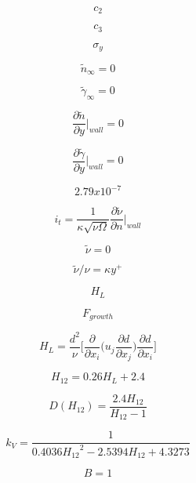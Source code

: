 \begin{equation}
c_2
\end{equation}

\begin{equation}
c_3
\end{equation}

\begin{equation}
\sigma_y
\end{equation}

\begin{equation}
\tilde{n}_{\infty} = 0
\end{equation}

\begin{equation}
\tilde{\gamma}_{\infty} = 0
\end{equation}

\begin{equation}
\frac{\partial \tilde{n}}{\partial y} \bigg|  _{wall} = 0
\end{equation}

\begin{equation}
\frac{\partial \tilde{\gamma}}{\partial y} \bigg|  _{wall} = 0
\end{equation}

\begin{equation}
2.79 {x} 10^{-7}
\end{equation}

\begin{equation}
i_t = \frac{1}{\kappa \sqrt{\nu \Omega}} \frac{\partial \tilde{\nu}}{\partial n} \bigg | _{wall}
\end{equation}

\begin{equation}
\tilde{\nu} = 0
\end{equation}

\begin{equation}
\tilde{\nu}/\nu = \kappa y^+
\end{equation}

\begin{equation}
H_L
\end{equation}

\begin{equation}
F_{growth}
\end{equation}

\begin{equation}
H_L = \frac{d^2}{\nu} \bigg[ \frac{\partial}{\partial x_i} \Big(u_j \frac{\partial d}{\partial x_j} \Big) \frac{\partial d}{\partial x_i} \bigg]
\end{equation}

\begin{equation}
H_{12} = 0.26 H_L + 2.4
\end{equation}

\begin{equation}
D(H_{12}) = \frac{2.4 H_{12}}{H_{12} - 1}
\end{equation}

\begin{equation}
k_V = \frac{1}{0.4036 {H_{12}}^2 - 2.5394 H_{12} + 4.3273}
\end{equation}

\begin{equation}
B=1
\end{equation}


